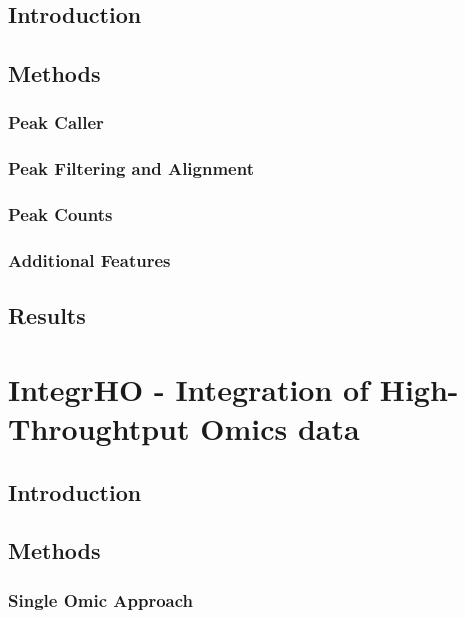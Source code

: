 \documentclass[b5paper,oneside,british,intoc,bibliograph=totoc,index=totoc,BCOR10mm,twoside,openright]{book}
\numberwithin{equation}{section}
\numberwithin{figure}{section}
\begin{document}
\section{Introduction}


\section{Methods}


\subsection{Peak Caller}


\subsection{Peak Filtering and Alignment}


\subsection{Peak Counts}


\subsection{Additional Features}


\section{Results}


\chapter{IntegrHO - Integration of High-Throughtput Omics data}
\section{Introduction}
\section{Methods}
\subsection{Single Omic Approach}
\end{document}
